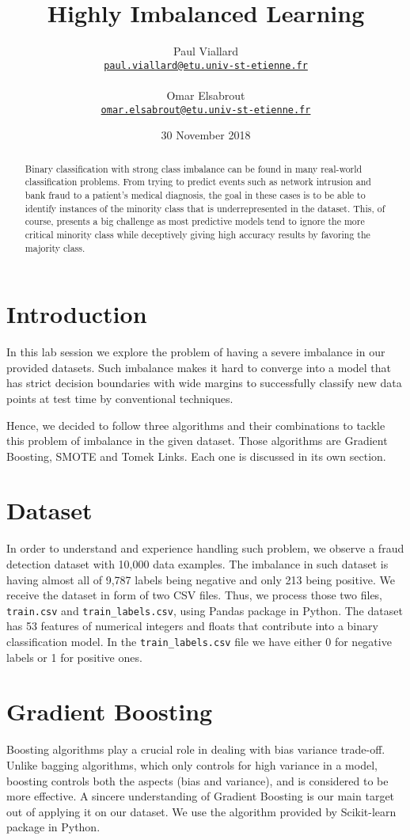 \documentclass{article}
\title{Highly Imbalanced Learning}
\author{Paul Viallard\\
  \texttt{\href{mailto:paul.viallard@etu.univ-st-etienne.fr}{paul.viallard@etu.univ-st-etienne.fr}} 
\\\\ Omar Elsabrout\\
\texttt{\href{mailto:omar.elsabrout@etu.univ-st-etienne.fr}{omar.elsabrout@etu.univ-st-etienne.fr}}}
\date{30 November 2018}
\begin{document}
\maketitle

\begin{abstract}
	Binary classification with strong class imbalance can be found in many real-world classification problems. From trying to predict events such as network intrusion and bank fraud to a patient's medical diagnosis, the goal in these cases is to be able to identify instances of the minority class that is underrepresented in the dataset. This, of course, presents a big challenge as most predictive models tend to ignore the more critical minority class while deceptively giving high accuracy results by favoring the majority class.
\end{abstract}

\section{Introduction}
	In this lab session we explore the problem of having a severe imbalance in our provided datasets. Such imbalance makes it hard to converge into a model that has strict decision boundaries with wide margins to successfully classify new data points at test time by conventional techniques.
	
	Hence, we decided to follow three algorithms and their combinations to tackle this problem of imbalance in the given dataset. Those algorithms are Gradient Boosting, SMOTE and Tomek Links. Each one is discussed in its own section.
	
\section{Dataset}
	In order to understand and experience handling such problem, we observe a fraud detection dataset with 10,000 data examples. The imbalance in such dataset is having almost all of 9,787 labels being negative and only 213 being positive. We receive the dataset in form of two CSV files. Thus, we process those two files, \texttt{train.csv} and \texttt{train\_labels.csv}, using Pandas\cite{pandas} package in Python. The dataset has 53 features of numerical integers and floats that contribute into a binary classification model. In the \texttt{train\_labels.csv} file we have either 0 for negative labels or 1 for positive ones.

\section{Gradient Boosting}
	Boosting algorithms play a crucial role in dealing with bias variance trade-off. Unlike bagging algorithms, which only controls for high variance in a model, boosting controls both the aspects (bias and variance), and is considered to be more effective. A sincere understanding of Gradient Boosting is our main target out of applying it on our dataset. We use the algorithm provided by Scikit-learn\cite{scikit-learn} package in Python.
	
\end{document}
